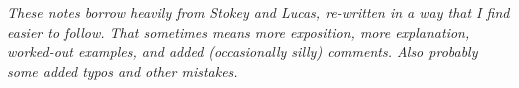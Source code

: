 \noindent \emph{These notes borrow heavily from Stokey and Lucas, re-written in a way that I find easier to follow. That sometimes means more exposition, more explanation, worked-out examples, and added (occasionally silly) comments. Also probably some added typos and other mistakes. }